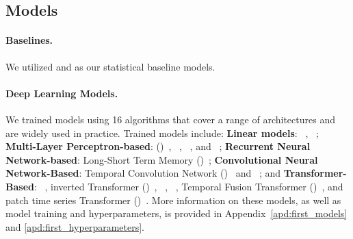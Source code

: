 \subsection{Models}

\paragraph{Baselines.} We utilized \ARIMA \citep{hyndman2008_arima,hyndman2024forecasting} and \ETS \citep{brown_1956_ets} as our statistical baseline models.

\paragraph{Deep Learning Models.} We trained models using 16 algorithms that cover a range of architectures and are widely used in practice. Trained models include: \textbf{Linear models}: \DLinear~\citep{zeng_2023_dlinear}, \NLinear~\citep{zeng_2023_dlinear}; \textbf{Multi-Layer Perceptron-based}: (\MLP)~\citep{rosenblatt1958_mlp}, \NHITS~\cite{challu_olivares2022_nhits}, 
\NBEATS~\cite{oreshkin2020nbeats, OlivaresChallu2022_nbeats}, and \TSMixer~\citep{chen2023tsmixer}; \textbf{Recurrent Neural Network-based}: Long-Short Term Memory (\LSTM)~\citep{sak2014_lstm}; \textbf{Convolutional Neural Network-Based}: Temporal Convolution Network (\TCN)~\citep{bai2018_tcn, oord2016_tcn} and \TimesNet~\citep{wu2023timesnettemporal2dvariationmodeling}; and \textbf{Transformer-Based}: \VanillaTransformer~\citep{vaswani_2021_attentionisallyouneed, zhou2021informerefficienttransformerlong}, inverted Transformer (\iTransformer)~\citep{liu2024itransformerinvertedtransformerseffective}, \Autoformer~\citep{wu_2021_autoformer}, \Informer~\citep{zhou2021informerefficienttransformerlong}, Temporal Fusion Transformer (\TFT)~\citep{lim2021_tft}, and patch time series Transformer (\PatchTST)~\citep{nie2023patchtst}. More information on these models, as well as model training and hyperparameters, is provided in Appendix~\ref{apd:first_models} and \ref{apd:first_hyperparameters}.


